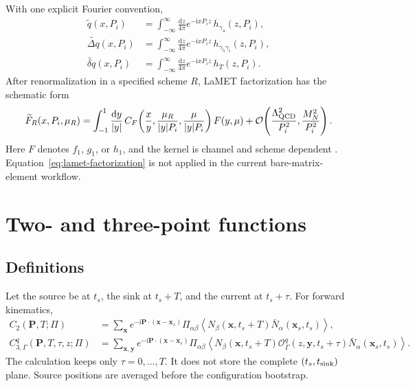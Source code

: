 \documentclass[11pt]{article}
\numberwithin{equation}{section}
\newcommand{\ii}{\mathrm{i}}
\newcommand{\dd}{\mathrm{d}}
\newcommand{\cO}{\mathcal{O}}
\newcommand{\qtilde}{\widetilde q}
\newcommand{\gtilde}{\widetilde{\Delta q}}
\newcommand{\htilde}{\widetilde{\delta q}}
\newcommand{\avg}[1]{\left\langle #1\right\rangle}
\begin{document}
With one explicit Fourier convention,
\begin{align}
  \qtilde(x,P_i)
  &=\int_{-\infty}^{\infty}\frac{\dd z}{4\pi}
    e^{-\ii xP_i z}\,h_{\gamma_4}(z,P_i),
  \\
  \gtilde(x,P_i)
  &=\int_{-\infty}^{\infty}\frac{\dd z}{4\pi}
    e^{-\ii xP_i z}\,h_{\gamma_5\gamma_i}(z,P_i),
  \\
  \htilde(x,P_i)
  &=\int_{-\infty}^{\infty}\frac{\dd z}{4\pi}
    e^{-\ii xP_i z}\,h_{T}(z,P_i).
  \label{eq:quasi-fourier}
\end{align}
After renormalization in a specified scheme $R$, LaMET factorization has the
schematic form
\begin{equation}
  \widetilde F_R(x,P_i,\mu_R)
  =\int_{-1}^{1}\frac{\dd y}{|y|}\,
   C_F\!\left(\frac{x}{y},\frac{\mu_R}{|y|P_i},
   \frac{\mu}{|y|P_i}\right)F(y,\mu)
   +\cO\!\left(\frac{\Lambda_{\rm QCD}^2}{P_i^2},
   \frac{M_N^2}{P_i^2}\right).
  \label{eq:lamet-factorization}
\end{equation}
Here $F$ denotes $f_1$, $g_1$, or $h_1$, and the kernel is channel and scheme
dependent \cite{Xiong2014,Izubuchi2018}.  Equation~\eqref{eq:lamet-factorization}
is not applied in the current bare-matrix-element workflow.

\section{Two- and three-point functions}

\subsection{Definitions}

Let the source be at $t_s$, the sink at $t_s+T$, and the current at
$t_s+\tau$.  For forward kinematics,
\begin{align}
  C_2(\bm P,T;\Pi)
  &=\sum_{\bm x}e^{-\ii\bm P\cdot(\bm x-\bm x_s)}
    \Pi_{\alpha\beta}
    \avg{N_\beta(\bm x,t_s+T)\bar N_\alpha(\bm x_s,t_s)},
  \\
  C_{3,\Gamma}^{q}(\bm P,T,\tau,z;\Pi)
  &=\sum_{\bm x,\bm y}e^{-\ii\bm P\cdot(\bm x-\bm x_s)}
    \Pi_{\alpha\beta}
    \avg{N_\beta(\bm x,t_s+T)
    \cO_\Gamma^q(z,\bm y,t_s+\tau)
    \bar N_\alpha(\bm x_s,t_s)}.
  \label{eq:c2-c3}
\end{align}
The calculation keeps only $\tau=0,\ldots,T$.  It does not store the complete
$(t_s,t_{\rm sink})$ plane.  Source positions are averaged before the
configuration bootstrap.
\end{document}
